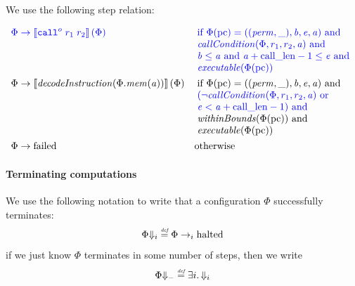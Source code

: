 \documentclass[a4paper]{article}
\begin{document}
We use the following step relation:

\begin{align*}
  \src{\Phi} & \; \src{\step \sem{\scall{o}{r_1}{r_2}}(\Phi)} &  &\sourcecolor\left.\arraycolsep=0pt
                                                  \begin{array}[t]{l}
                                                    \text{if }\Phi(\pcreg) = ((\perm,\_),\baddr,\eaddr,\aaddr) \tand \\
                                                    \callCond{\Phi,r_1,r_2,\aaddr} \tand\\
                                                    \baddr \leq \aaddr \tand \aaddr + \calllen-1 \leq \eaddr \tand \\
                                                    \exec{\Phi(\pcreg)}
                                                  \end{array}\right.\\
  \Phi & \step \sem{\decInstr{\Phi.\mem(\aaddr)}}(\Phi) & &\left.\arraycolsep=0pt
                                                  \begin{array}[t]{l}
                                                    \text{if }\Phi(\pcreg) = ((\perm,\_),\baddr,\eaddr,\aaddr) \tand \\
                                                    \src{(\neg\callCond{\Phi,r_1,r_2,\aaddr} \tor}\\
                                                    \src{\eaddr < \aaddr + \calllen-1) \tand} \\
                                                    \withinBounds{\Phi(\pcreg)} \tand \\
                                                    \exec{\Phi(\pcreg)}
                                                  \end{array}\right.\\
  \Phi& \step \failed & & \totherwise
\end{align*}

\paragraph{Terminating computations}
We use the following notation to write that a configuration $\Phi$ successfully terminates:
\[
  \Phi\term[i] \defeq \Phi \nstep[i] \halted
\]
if we just know $\Phi$ terminates in some number of steps, then we write
\[
  \Phi\term \defeq \exists i \ldotp \term[i]
\]
\end{document}
